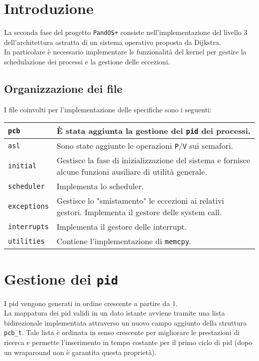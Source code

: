 \documentclass[11pt]{article}
\begin{document}
\newpage

\section{Introduzione}
La seconda fase del progetto \texttt{PandOS+} consiste nell'implementazione del livello 3 dell'architettura astratta di un sistema operativo proposta da Dijkstra. \\
In particolare è necessario implementare le funzionalità del kernel per gestire la schedulazione dei processi e la gestione delle eccezioni.

\subsection{Organizzazione dei file}
I file coinvolti per l'implementazione delle specifiche sono i seguenti:
\begin{center}
    \begin{tabular}{ | m{3cm} | m{10cm} | } 
        \hline
        \texttt{pcb}          & È stata aggiunta la gestione dei \texttt{pid} dei processi. \\ 
        \hline
        \texttt{asl}          & Sono state aggiunte le operazioni \texttt{P}/\texttt{V} sui semafori. \\ 
        \hline
        \texttt{initial}      & Gestisce la fase di inizializzazione del sistema e fornisce alcune funzioni ausiliare di utilità generale. \\ 
        \hline
        \texttt{scheduler}    & Implementa lo scheduler. \\ 
        \hline
        \texttt{exceptions}   & Gestisce lo "smistamento" le eccezioni ai relativi gestori. Implementa il gestore delle system call. \\ 
        \hline
        \texttt{interrupts}   & Implementa il gestore delle interrupt. \\ 
        \hline
        \texttt{utilities}    & Contiene l'implementazione di \texttt{memcpy}. \\ 
        \hline
    \end{tabular}
\end{center}

\section{Gestione dei \texttt{pid}}
I pid vengono generati in ordine crescente a partire da 1.\\
La mappatura dei pid validi in un dato istante avviene tramite una lista bidirezionale implementata attraverso un nuovo campo aggiunto della struttura \texttt{pcb\_t}.
Tale lista è ordinata in senso crescente per migliorare le prestazioni di ricerca e permette l'inserimento in tempo costante per il primo ciclo di pid (dopo un wraparound non è garantita questa proprietà).
\end{document}
